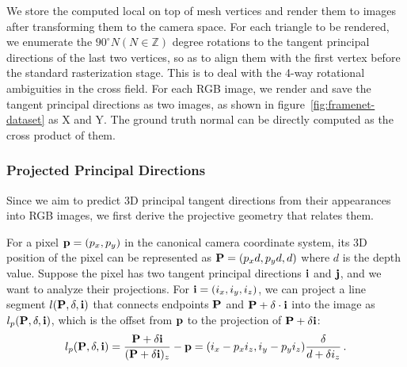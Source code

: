We store the computed local \cframe{} on top of mesh vertices and render them to images after transforming them to the camera space. For each triangle to be rendered, we enumerate the $90^{\circ}N (N\in \mathbb{Z})$ degree rotations to the tangent principal directions of the last two vertices, so as to align them with the first vertex before the standard rasterization stage. This is to deal with the 4-way rotational ambiguities in the cross field. For each RGB image, we render and save the tangent principal directions as two images, as shown in figure~\ref{fig:framenet-dataset} as X and Y. The ground truth normal can be directly computed as the cross product of them.

\subsubsection{Projected Principal Directions}
\label{sec:framenet-project}
Since we aim to predict 3D principal tangent directions from their appearances into RGB images, we first derive the projective geometry that relates them.


 For a pixel $\mathbf{p}=(p_x,p_y)$ in the canonical camera coordinate system, its 3D position of the pixel can be represented as $\mathbf{P}=(p_xd, p_yd, d)$ where $d$ is the depth value. Suppose the pixel has two tangent principal directions $\mathbf{i}$ and $\mathbf{j}$, and we want to analyze their projections. For $\mathbf{i}=(i_x,i_y,i_z)$, we can project a line segment $l(\mathbf{P},\delta,\mathbf{i})$ that connects endpoints $\mathbf{P}$ and $\mathbf{P}+\delta \cdot \mathbf{i}$ into the image as $l_p(\textbf{P},\delta,\mathbf{i})$, which is the offset from $\mathbf{p}$ to the projection of $\mathbf{P}+\delta \mathbf{i}$:
\begin{equation}
    l_p(\textbf{P},\delta,\textbf{i}) = \frac{\textbf{P}+\delta \textbf{i}}{(\textbf{P}+\delta \textbf{i})_z}-\mathbf{p}=(i_x - p_x i_z, i_y - p_y i_z)\frac{\delta}{d+\delta i_z}\,.
\end{equation}

